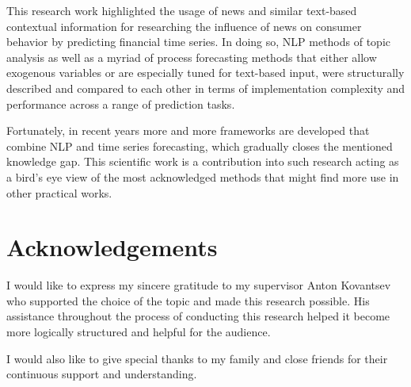 \documentclass[3p,times,procedia]{elsarticle}
\begin{document}
This research work highlighted the usage of news and similar text-based contextual information for researching the influence of news on consumer behavior by predicting financial time series. In doing so, NLP methods of topic analysis as well as a myriad of process forecasting methods that either allow exogenous variables or are especially tuned for text-based input, were structurally described and compared to each other in terms of implementation complexity and performance across a range of prediction tasks.

Fortunately, in recent years more and more frameworks are developed that combine NLP and time series forecasting, which gradually closes the mentioned knowledge gap. This scientific work is a contribution into such research acting as a bird's eye view of the most acknowledged methods that might find more use in other practical works. 

\section*{Acknowledgements}

I would like to express my sincere gratitude to my supervisor Anton Kovantsev who supported the choice of the topic and made this research possible. His assistance throughout the process of conducting this research helped it become more logically structured and helpful for the audience.

I would also like to give special thanks to my family and close friends for their continuous support and understanding.





%
%



{}

\end{document}
